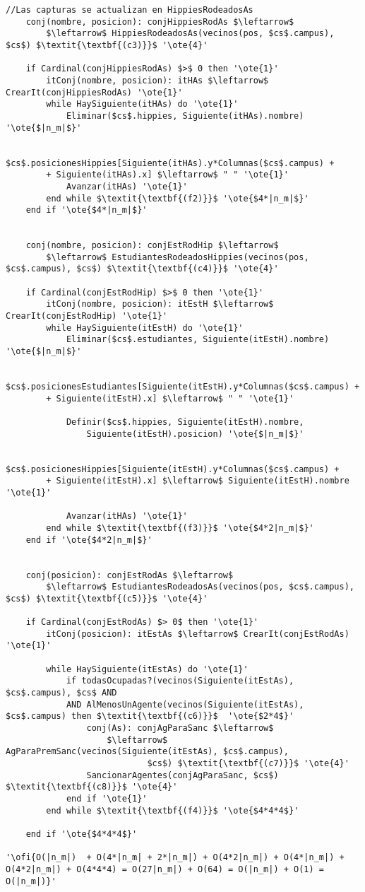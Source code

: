 \begin{lstlisting}[mathescape]
	//Las capturas se actualizan en HippiesRodeadosAs
	conj(nombre, posicion): conjHippiesRodAs $\leftarrow$
		$\leftarrow$ HippiesRodeadosAs(vecinos(pos, $cs$.campus), $cs$) $\textit{\textbf{(c3)}}$ '\ote{4}'

	if Cardinal(conjHippiesRodAs) $>$ 0 then '\ote{1}'
		itConj(nombre, posicion): itHAs $\leftarrow$ CrearIt(conjHippiesRodAs) '\ote{1}'
		while HaySiguiente(itHAs) do '\ote{1}'
			Eliminar($cs$.hippies, Siguiente(itHAs).nombre) '\ote{$|n_m|$}'

			$cs$.posicionesHippies[Siguiente(itHAs).y*Columnas($cs$.campus) +
		+ Siguiente(itHAs).x] $\leftarrow$ " " '\ote{1}'
			Avanzar(itHAs) '\ote{1}'
		end while $\textit{\textbf{(f2)}}$ '\ote{$4*|n_m|$}'
	end if '\ote{$4*|n_m|$}'


	conj(nombre, posicion): conjEstRodHip $\leftarrow$
		$\leftarrow$ EstudiantesRodeadosHippies(vecinos(pos, $cs$.campus), $cs$) $\textit{\textbf{(c4)}}$ '\ote{4}'

	if Cardinal(conjEstRodHip) $>$ 0 then '\ote{1}'
		itConj(nombre, posicion): itEstH $\leftarrow$ CrearIt(conjEstRodHip) '\ote{1}'
		while HaySiguiente(itEstH) do '\ote{1}'
			Eliminar($cs$.estudiantes, Siguiente(itEstH).nombre) '\ote{$|n_m|$}'

			$cs$.posicionesEstudiantes[Siguiente(itEstH).y*Columnas($cs$.campus) +
		+ Siguiente(itEstH).x] $\leftarrow$ " " '\ote{1}'

			Definir($cs$.hippies, Siguiente(itEstH).nombre,
				Siguiente(itEstH).posicion) '\ote{$|n_m|$}'

			$cs$.posicionesHippies[Siguiente(itEstH).y*Columnas($cs$.campus) +
		+ Siguiente(itEstH).x] $\leftarrow$ Siguiente(itEstH).nombre '\ote{1}'

			Avanzar(itHAs) '\ote{1}'
		end while $\textit{\textbf{(f3)}}$ '\ote{$4*2|n_m|$}'
	end if '\ote{$4*2|n_m|$}'


	conj(posicion): conjEstRodAs $\leftarrow$
		$\leftarrow$ EstudiantesRodeadosAs(vecinos(pos, $cs$.campus), $cs$) $\textit{\textbf{(c5)}}$ '\ote{4}'

	if Cardinal(conjEstRodAs) $> 0$ then '\ote{1}'
		itConj(posicion): itEstAs $\leftarrow$ CrearIt(conjEstRodAs) '\ote{1}'

		while HaySiguiente(itEstAs) do '\ote{1}'
			if todasOcupadas?(vecinos(Siguiente(itEstAs), $cs$.campus), $cs$ AND
			AND AlMenosUnAgente(vecinos(Siguiente(itEstAs), $cs$.campus) then $\textit{\textbf{(c6)}}$  '\ote{$2*4$}'
				conj(As): conjAgParaSanc $\leftarrow$
					$\leftarrow$ AgParaPremSanc(vecinos(Siguiente(itEstAs), $cs$.campus),
							$cs$) $\textit{\textbf{(c7)}}$ '\ote{4}'
				SancionarAgentes(conjAgParaSanc, $cs$) $\textit{\textbf{(c8)}}$ '\ote{4}'
			end if '\ote{1}'
		end while $\textit{\textbf{(f4)}}$ '\ote{$4*4*4$}'

	end if '\ote{$4*4*4$}'

'\ofi{O(|n_m|)  + O(4*|n_m| + 2*|n_m|) + O(4*2|n_m|) + O(4*|n_m|) + O(4*2|n_m|) + O(4*4*4) = O(27|n_m|) + O(64) = O(|n_m|) + O(1) = O(|n_m|)}'
\end{lstlisting}

